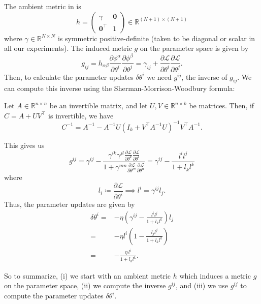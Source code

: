 \documentclass{article}
\newcommand{\loss}{\mathcal{L}}
\newcommand{\vecb}[1]{\boldsymbol{#1}}
\begin{document}
The ambient metric in \cite{harvey2025} is $$
    h = \begin{pmatrix} \gamma & \vecb{0} \\ \vecb{0}^\top & 1 \end{pmatrix}\in\mathbb{R}^{(N+1)\times(N+1)}
$$ where $\gamma\in\mathbb{R}^{N\times N}$ is symmetric positive-definite (taken to be diagonal or scalar in all our experiments).
The induced metric $g$ on the parameter space is given by
\begin{equation}\label{eq:induced-metric}
    g_{ij}
    = h_{\alpha\beta} \frac{\partial \phi^\alpha}{\partial \theta^i} \frac{\partial \phi^\beta}{\partial \theta^j}
    = \gamma_{ij} + \frac{\partial \loss}{\partial \theta^i} \frac{\partial \loss}{\partial \theta^j}.
\end{equation}
Then, to calculate the parameter updates $\delta \theta^i$ we need $g^{ij}$, the inverse of $g_{ij}$.
We can compute this inverse using the Sherman-Morrison-Woodbury formula:
\begin{tcolorbox}[colback=gray!8, colframe=gray!22, breakable, title=\textbf{Sherman-Morrison-Woodbury Formula}, coltitle=black]
    Let $A\in\mathbb{R}^{n\times n}$ be an invertible matrix, and let $U,V\in\mathbb{R}^{n\times k}$ be matrices.
    Then, if $C = A + U V^\top$ is invertible, we have $$C^{-1} = A^{-1} - A^{-1} U (I_k + V^\top A^{-1} U)^{-1} V^\top A^{-1}.$$
\end{tcolorbox}
\noindent This gives us
\begin{equation}\label{eq:inverse-metric}
    g^{ij}
    = \gamma^{ij} - \frac{\gamma^{ik}\gamma^{jl} \frac{\partial \loss}{\partial \theta^k} \frac{\partial \loss}{\partial \theta^l}}{1 + \gamma^{mn} \frac{\partial \loss}{\partial \theta^m} \frac{\partial \loss}{\partial \theta^n}}
    = \gamma^{ij} - \frac{l^i l^j}{1+l_k l^k}
\end{equation} where $$
    l_i \coloneqq \frac{\partial\loss}{\partial \theta^i} \implies l^i = \gamma^{ij} l_j.
$$ Thus, the parameter updates are given by
\begin{align}\label{eq:fixed-theory}
    \delta \theta^i =& -\eta \left( \gamma^{ij} - \frac{l^i l^j}{1+l_k l^k} \right) l_j \nonumber\\
    =& -\eta l^i \left( 1 - \frac{l_j l^j}{1+l_k l^k} \right) \nonumber\\
    =& -\frac{\eta\, l^i}{1+l_k l^k}.
\end{align}

So to summarize, (i) we start with an ambient metric $h$ which induces a metric $g$ on the parameter space,
(ii) we compute the inverse $g^{ij}$, and
(iii) we use $g^{ij}$ to compute the parameter updates $\delta \theta^i$.
\end{document}
